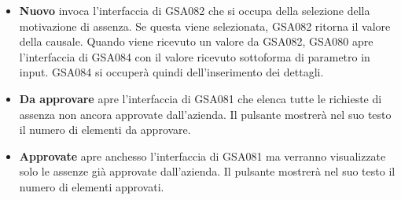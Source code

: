 \documentclass[target=bach,aauheader=,style=]{thud}
\begin{document}
\begin{itemize}
    \item \textbf{Nuovo} invoca l'interfaccia di GSA082 che si occupa della selezione della motivazione di assenza. 
    Se questa viene selezionata, GSA082 ritorna il valore della causale. 
    Quando viene ricevuto un valore da GSA082, GSA080 apre l'interfaccia di GSA084 con il valore ricevuto sottoforma di parametro in input.
    GSA084 si occuperà quindi dell'inserimento dei dettagli. 
        
    \item \textbf{Da approvare} apre l'interfaccia di GSA081 che elenca tutte le richieste di assenza non ancora approvate dall'azienda. Il pulsante mostrerà nel suo testo il numero di elementi da approvare.
    
    \item \textbf{Approvate} apre anchesso l'interfaccia di GSA081 ma verranno visualizzate solo le assenze già approvate dall'azienda. Il pulsante mostrerà nel suo testo il numero di elementi approvati.
\end{itemize}
\end{document}
